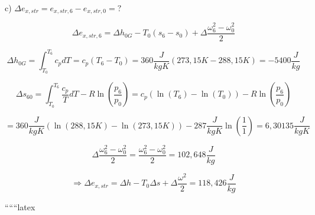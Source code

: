 c) $\Delta e_{x,str} = e_{x,str,6} - e_{x,str,0} = ?$

\[
\Delta e_{x,str,6} = \Delta h_{0G} - T_0 (s_6 - s_0) + \Delta \frac{\omega^2_6 - \omega^2_0}{2}
\]

\[
\Delta h_{0G} = \int_{T_0}^{T_6} c_p dT = c_p (T_6 - T_0) = 360 \frac{J}{kgK} (273,15 K - 288,15 K) = -5400 \frac{J}{kg}
\]

\[
\Delta s_{60} = \int_{T_0}^{T_6} \frac{c_p}{T} dT - R \ln \left( \frac{p_6}{p_0} \right) = c_p \left( \ln(T_6) - \ln(T_0) \right) - R \ln \left( \frac{p_6}{p_0} \right)
\]

\[
= 360 \frac{J}{kgK} \left( \ln(288,15 K) - \ln(273,15 K) \right) - 287 \frac{J}{kgK} \ln \left( \frac{1}{1} \right) = 6,30135 \frac{J}{kgK}
\]

\[
\Delta \frac{\omega^2_6 - \omega^2_0}{2} = \frac{\omega^2_6 - \omega^2_0}{2} = 102,648 \frac{J}{kg}
\]

\[
\Rightarrow \Delta e_{x,str} = \Delta h - T_0 \Delta s + \Delta \frac{\omega^2}{2} = 118,426 \frac{J}{kg}
\]

``````latex